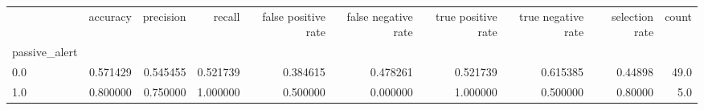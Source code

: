 \begin{tabular}{lrrrrrrrrr}
\toprule
{} &  accuracy &  precision &    recall &  false positive rate &  false negative rate &  true positive rate &  true negative rate &  selection rate &  count \\
passive\_alert &           &            &           &                      &                      &                     &                     &                 &        \\
\midrule
0.0           &  0.571429 &   0.545455 &  0.521739 &             0.384615 &             0.478261 &            0.521739 &            0.615385 &         0.44898 &   49.0 \\
1.0           &  0.800000 &   0.750000 &  1.000000 &             0.500000 &             0.000000 &            1.000000 &            0.500000 &         0.80000 &    5.0 \\
\bottomrule
\end{tabular}
